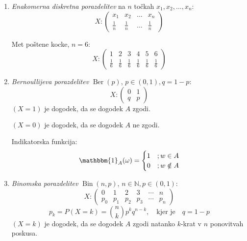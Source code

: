 \documentclass[12pt]{book}
\theoremstyle{definition}
\theoremstyle{plain}
\theoremstyle{plain}
\theoremstyle{plain}
\theoremstyle{remark}
\begin{document}
\begin{enumerate}
    \item \emph{Enakomerna diskretna porazdelitev} na $n$ točkah $x_1, x_2, \ldots, x_n$:
    $$
    X:\left(\begin{array}{cccc}
        x_1 & x_2 & \ldots & x_n \\
        \frac{1}{n} & \frac{1}{n} & \ldots & \frac{1}{n}
        \end{array}\right)
    $$
    \begin{zgled}
        Met poštene kocke, $n=6$:
        $$
        X:\left(\begin{array}{cccccc}
            1 & 2 & 3 & 4 & 5 & 6 \\
            \frac{1}{6} & \frac{1}{6} & \frac{1}{6} & \frac{1}{6} & \frac{1}{6}  & \frac{1}{6}
            \end{array}\right)
        $$
    \end{zgled}
    \item \emph{Bernoullijeva porazdelitev} $\operatorname{Ber}(p)$, $p\in (0,1), q = 1-p$:
    $$
    X:\left(\begin{array}{cc}
        0 & 1 \\
        q & p
        \end{array}\right)
    $$
    $(X=1)$ je dogodek, da se dogodek $A$ zgodi.

    $(X=0)$ je dogodek, da se dogodek $A$ ne zgodi. 

    Indikatorska funkcija: 
    $$
    \mathbbm{1}_A(\omega)= \begin{cases}1 &; w \in A \\ 0 &; w \notin A\end{cases}
    $$
    \item \emph{Binomska porazdelitev} $\operatorname{Bin}(n,p)$, $n \in \mathbb{N}, p \in (0,1)$:
    $$
    X:\left(\begin{array}{cccccc}
        0 & 1 & 2 & 3 & \cdots & n \\
        p_0 & p_1 & p_2 & p_3 & \cdots & p_n
        \end{array}\right)
    $$
    $$
    p_k=P(X=k)=\binom{n}{k} p^k q^{n-k}, \quad \text{kjer je} \quad q = 1-p 
    $$
    $(X=k)$ je dogodek, da se dogodek $A$ zgodi natanko $k$-krat v $n$ ponovitvah poskusa. 


\end{enumerate}
\end{document}
